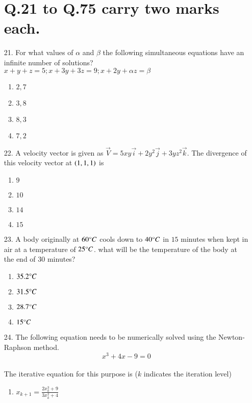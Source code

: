 \documentclass[journal,12pt,onecolumn]{IEEEtran}
\theoremstyle{remark}
\begin{document}
\begin{enumerate}
		\section*{Q.21 to Q.75 carry two marks each.}
\item[21.] For what values of $\alpha$ and $\beta$ the following simultaneous equations have an infinite number of solutions?\\ $x+y+z=5;  x+3y+3z=9;  x+2y+\alpha z= \beta$
	\begin{enumerate}
                \item $2,7$
                \item $3,8$
                \item $8,3$
                \item $7,2$
        \end{enumerate}
\item[22.] A velocity vector is given as $\overrightarrow{V}= 5xy\overrightarrow{i}+2y^2\overrightarrow{j}+3yz^2\overrightarrow{k}$. The divergence of this velocity vector at $\left(1,1,1\right)$ is
	\begin{enumerate}
                \item $9$
                \item $10$
                \item $14$
                \item $15$
        \end{enumerate}
\item[23.] A body originally at $60{\degree}C$ cools down to $40{\degree}C$ in $15$ minutes when kept in air at a temperature of $25{\degree}C$. what will be the temperature of the body at the end of $30$ minutes?
	\begin{enumerate}
		\item $35.2{\degree}C$
                \item $31.5{\degree}C$
                \item $28.7{\degree}C$
                \item $15{\degree}C$
        \end{enumerate}
\item[24.] The following equation needs to be numerically solved using the Newton-Raphson method.\\ $$x^3+4x-9=0$$\\The iterative equation for this purpose is ($k$ indicates the iteration level)
	\begin{enumerate}
		\item $x_{k+1}=\frac{2x_k^3+9}{3x_k^2+4}$

\end{enumerate}
\end{enumerate}
\end{document}
